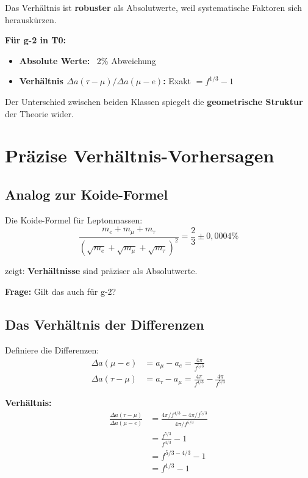 	Das Verhältnis ist \textbf{robuster} als Absolutwerte, weil systematische Faktoren sich herauskürzen.
	
	\textbf{Für g-2 in T0:}
	\begin{itemize}
		\item \textbf{Absolute Werte:} ~2\% Abweichung
		\item \textbf{Verhältnis $\Delta a(\tau-\mu)/\Delta a(\mu-e)$:} Exakt $= f^{1/3} - 1$
	\end{itemize}
	
	Der Unterschied zwischen beiden Klassen spiegelt die \textbf{geometrische Struktur} der Theorie wider.	
	\section{Präzise Verhältnis-Vorhersagen}
	
	\subsection{Analog zur Koide-Formel}
	
	Die Koide-Formel für Leptonmassen:
	\begin{equation}
		\frac{m_e + m_\mu + m_\tau}{(\sqrt{m_e} + \sqrt{m_\mu} + \sqrt{m_\tau})^2} = \frac{2}{3} \pm 0{,}0004\%
	\end{equation}
	
	zeigt: \textbf{Verhältnisse} sind präziser als Absolutwerte.
	
	\textbf{Frage:} Gilt das auch für g-2?
	
	\subsection{Das Verhältnis der Differenzen}
	
	Definiere die Differenzen:
	\begin{align}
		\Delta a(\mu - e) &= a_\mu - a_e = \frac{4\pi}{f^{5/3}} \\
		\Delta a(\tau - \mu) &= a_\tau - a_\mu = \frac{4\pi}{f^{4/3}} - \frac{4\pi}{f^{5/3}}
	\end{align}
	
	\textbf{Verhältnis:}
	\begin{align}
		\frac{\Delta a(\tau - \mu)}{\Delta a(\mu - e)} &= \frac{4\pi/f^{4/3} - 4\pi/f^{5/3}}{4\pi/f^{5/3}} \\
		&= \frac{f^{5/3}}{f^{4/3}} - 1 \\
		&= f^{5/3 - 4/3} - 1 \\
		&= f^{1/3} - 1
		\label{eq:ratio}
	\end{align}
	
